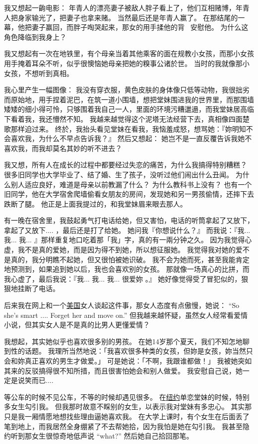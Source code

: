\documentclass[12pt]{report}
\begin{document}
我又想起一齣电影： 年青人的漂亮妻子被敌人胖子看上了，他们互相赌博，年青人把身家输光了，把妻子也拿来赌。  当然最后还是年青人赢了。  在那结尾的一幕，他把妻子赢回，而胖子啕哭起来，那女的用手揉他的背 ~安慰他。  为什么这角色降临到我身上？

我又想起有一次在地铁里，有个母亲当着其他乘客的面在规教小女孩，而那小女孩用手掩着耳朵不听，似乎很懊恼她母亲把她的糗事公诸於世。  当时的我就像那小女孩，不想听到真相。

我心里产生一幅图像： 我没有穿衣服，黄色皮肤的身体像只低等动物，我很拙劣而原始地，用手捏着泥巴，在筑一道小围墙，想把堂妹围进我的世界里，而那围墙矮矮的细小得可怜，只够围着我自己一人，里面的环境污糟邋遢，而我堂妹居高临下看着我，我还懵然不知。  我越来越觉得这个泥塔无法经营下去，真相像四面楚歌那样迫过来。  终於，我抬头看见堂妹在看我，我恼羞成怒，想骂她：『妳明知不会喜欢我，为什么不早点告诉我？』  然后又想起： 她岂不是一直反覆告诉我她不喜欢我，而我却莫名其妙的听不进去？

我又想，所有人在成长的过程中都要经过失恋的痛苦，为什么我搞得特别糟糕？  很多旧同学也大学毕业了、结了婚、生了孩子，没听过他们闹出什么丑闻。  为什么别人适应良好，难道是母亲以前教漏了什么？   为什么教科书上没有？   也有一个旧同学，他在大学宿舍爬墙偷看女朋友的房间，发现她和另一男孩偷情，还摔下去跌断了腿。   他正是上面我提过的，和我堂妹眉来眼去那人。

有一晚在宿舍里，我鼓起勇气打电话给她，但又害怕，电话的听筒拿起了又放下，拿起了又放下.... ，最后还是打了给她。 她问我『你想说什么？』   而我说：『我... 我... 我... 』那样重复地口吃着那「我」字，真的有一兩分钟之久。  因为我觉得心虚，我不是真的爱她，而是因为得不到她，所以想征服她。  我觉得我对她的爱不是真的，我分明瞧不起她，但又很怕被她识破。  我不会为她而死，甚至我能肯定地预测到，如果追到她以后，我也会喜欢别的女孩。  那就像一场真心的比拼，而我心虚了，最后我说：『我... 我... 我... 很爱妳 。』  她好像觉得受了冒犯似的，狠狠地挂断了电话。

后来我在网上和一个\uline{美国}女人谈起这件事，那女人态度有点傲慢，她说： ``So she's smart .... Forget her and move on.''  但我越来越怀疑，虽然女人经常看爱情小说，但其实女人是不是真的比男人更懂爱情？

我想起，其实她似乎也喜欢很多别的男孩。 在她14岁那个夏天，我们不知怎地聊到性的话题。  我理所当然地说：「我喜欢很多种类的女孩，但妳是女孩，妳当然只会和妳真正喜欢的男生才做爱。」 可是她说：「不啊，我跟谁都做！」 我被她突如其来的反驳搞得很不知所措，而且很害怕她会和别人做爱。 我安慰自己说，她一定是说笑而已....

等公车的时候不见公车，不等的时候却遇见很多。  在\uline{纽约}单恋堂妹的时候，特别多女生勾引我。 但我那时故意不睬别的女生，以表示我对堂妹有多忠心。  其实那只是我一厢情愿地想找些理由逼她喜欢我。  在大学上课时，有个女生在后面丢了笔到地上，而我居然全身绷紧了不去帮她拾，因为我怕是她在勾引我。  我甚至隐约听到那女生很惊奇地低声说 ``what?'' 然后她自己拾回那笔。
\end{document}
